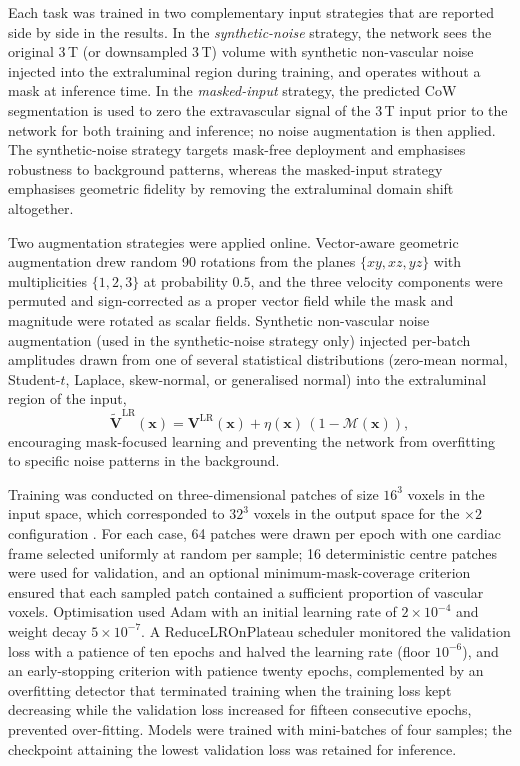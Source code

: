 Each task was trained in two complementary input strategies that are
reported side by side in the results. In the \emph{synthetic-noise}
strategy, the network sees the original 3\,T (or downsampled 3\,T)
volume with synthetic non-vascular noise injected into the extraluminal
region during training, and operates without a mask at inference time.
In the \emph{masked-input} strategy, the predicted CoW segmentation is
used to zero the extravascular signal of the 3\,T input prior to the
network for both training and inference; no noise augmentation is then
applied. The synthetic-noise strategy targets mask-free deployment and
emphasises robustness to background patterns, whereas the masked-input
strategy emphasises geometric fidelity by removing the extraluminal
domain shift altogether.

Two augmentation strategies were applied online. Vector-aware geometric
augmentation drew random 90\textdegree{} rotations from the planes
$\{xy,xz,yz\}$ with multiplicities $\{1,2,3\}$ at probability $0.5$,
and the three velocity components were permuted and sign-corrected as
a proper vector field while the mask and magnitude were rotated as
scalar fields. Synthetic non-vascular noise augmentation (used in the
synthetic-noise strategy only) injected per-batch amplitudes drawn
from one of several statistical distributions (zero-mean normal,
Student-$t$, Laplace, skew-normal, or generalised normal) into the
extraluminal region of the input,
\begin{equation}
    \tilde{\mathbf{V}}^{\mathrm{LR}}(\mathbf{x})
    = \mathbf{V}^{\mathrm{LR}}(\mathbf{x})
      + \eta(\mathbf{x})\,(1-\mathcal{M}(\mathbf{x})),
\end{equation}
encouraging mask-focused learning and preventing the network from
overfitting to specific noise patterns in the background.

Training was conducted on three-dimensional patches of size $16^{3}$
voxels in the input space, which corresponded to $32^{3}$ voxels in
the output space for the $\times 2$ configuration
\cite{peiffer2024patch}. For each case, 64 patches were drawn per epoch
with one cardiac frame selected uniformly at random per sample; 16
deterministic centre patches were used for validation, and an optional
minimum-mask-coverage criterion ensured that each sampled patch
contained a sufficient proportion of vascular voxels. Optimisation used
Adam \cite{kingma2015adam} with an initial learning rate of
$2{\times}10^{-4}$ and weight decay $5{\times}10^{-7}$. A
ReduceLROnPlateau scheduler monitored the validation loss with a
patience of ten epochs and halved the learning rate (floor
$10^{-6}$), and an early-stopping criterion with patience twenty
epochs, complemented by an overfitting detector that terminated
training when the training loss kept decreasing while the validation
loss increased for fifteen consecutive epochs, prevented over-fitting.
Models were trained with mini-batches of four samples; the checkpoint
attaining the lowest validation loss was retained for inference.

